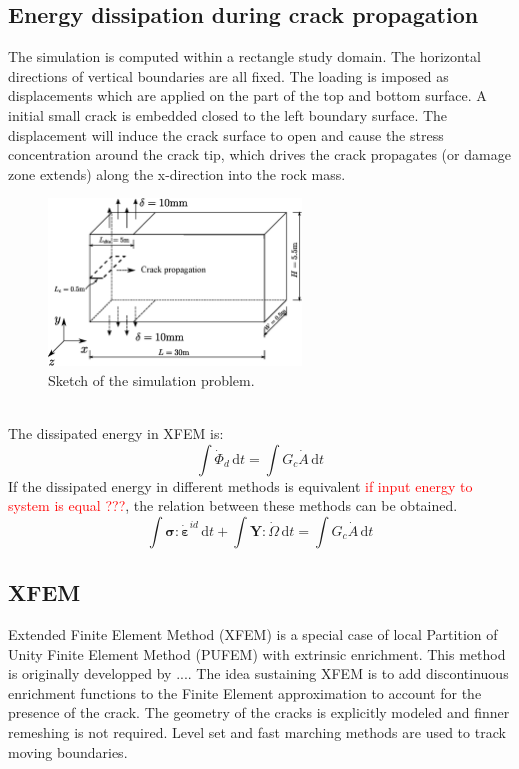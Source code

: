 \documentclass[preprint,review,12pt]{elsarticle}
\newcommand{\ud}{\textrm{d}}
\begin{document}
\subsection{Energy dissipation during crack propagation}
%
The simulation is computed within a rectangle study domain. The horizontal directions of vertical boundaries are all fixed. The loading is imposed as displacements which are applied on the part of the top and bottom surface. A initial small crack is embedded closed to the left boundary surface. The displacement will induce the crack surface to open and cause the stress concentration around the crack tip, which drives the crack propagates (or damage zone extends) along the x-direction into the rock mass.
\
\\
\begin{figure}[htbp]
   \centering
  \includegraphics[width=0.6\textwidth]{inkscape/sketch/sketch.eps}
   \caption{Sketch of the simulation problem.}
   \label{fig:sketch}
\end{figure}
\
\\
The dissipated energy in XFEM is:
%
\begin{equation}
\label{eq:diss_XFEM}
    \int \dot\varPhi_{d} \, \ud t = \int G_c\dot{A} \,\ud{t}
\end{equation}
%
If the dissipated energy in different methods is equivalent \textcolor{red}{if input energy to system is equal ???}, the relation between these methods can be obtained.
\begin{equation}
\label{eq:diss_XFEM}
    \int \bm\sigma:\dot{\bm\varepsilon}^{id}\,\ud{t}+\int\bm{Y}:\dot{\bm\varOmega}\,\ud{t} =
    \int G_c\dot{A} \,\ud{t}
\end{equation}
\subsection{XFEM}
\noindent
Extended Finite Element Method (XFEM) is a special case of local Partition of Unity Finite Element Method (PUFEM) with extrinsic enrichment. This method is originally developped by .... The idea sustaining XFEM is to add discontinuous enrichment functions to the Finite Element approximation to account for the presence of the crack. The geometry of the cracks is explicitly modeled and finner remeshing is not required. Level set and fast marching methods are used to track moving boundaries.
%
\end{document}
